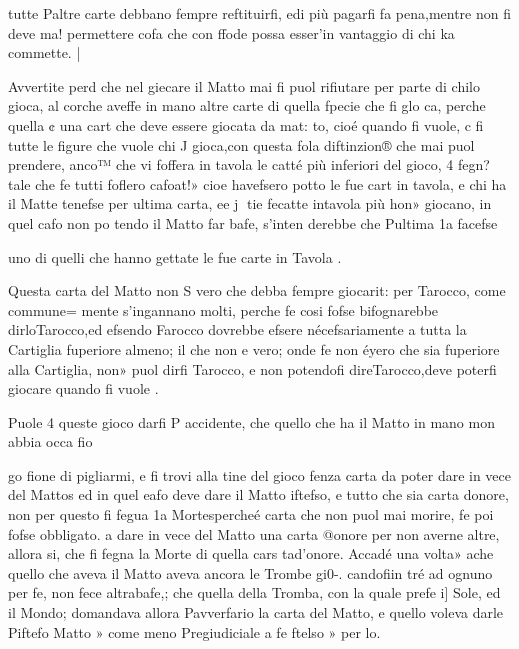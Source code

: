 \documentclass[12pt,a6paper]{article}
\begin{document}
 

 

 

 

 

tutte Paltre carte debbano fempre reftituirfi, edi più pagarfi
fa pena,mentre non fi deve ma!
permettere cofa che con ffode possa esser’in vantaggio di
chi ka commette. |

Avvertite perd che nel giecare il Matto mai fi puol rifiutare per parte di chilo gioca, al
corche aveffe in mano altre
carte di quella fpecie che fi glo
ca, perche quella ¢ una cart
che deve essere giocata da mat:
to, cioé quando fi vuole, c fi
tutte le figure che vuole chi J
gioca,con questa fola diftinzion®
che mai puol prendere, anco™
che vi foffera in tavola le catté
più inferiori del gioco, 4 fegn?
tale che fe tutti foflero cafoat!»
cioe havefsero potto le fue cart
in tavola, e chi ha il Matte
tenefse per ultima carta, ee j
tie fecatte intavola più hon»
giocano, in quel cafo non po
tendo il Matto far bafe, s'inten
derebbe che Pultima 1a facefse

uno di quelli che hanno gettate
le fue carte in Tavola .

Questa carta del Matto non S
vero che debba fempre giocarit:
per Tarocco, come commune=
mente s'ingannano molti, perche fe cosi fofse bifognarebbe
dirloTarocco,ed efsendo Farocco dovrebbe efsere nécefsariamente a tutta la Cartiglia fuperiore almeno; il che non e vero; onde fe non éyero che sia
fuperiore alla Cartiglia, non»
puol dirfi Tarocco, e non potendofi direTarocco,deve poterfi
giocare quando fi vuole .

Puole 4 queste gioco darfi P
accidente, che quello che ha il
Matto in mano mon abbia occa
fio
 

 
 

go
fione di pigliarmi, e fi trovi alla tine del gioco fenza carta da
poter dare in vece del Mattos
ed in quel eafo deve dare il Matto iftefso, e tutto che sia carta
donore, non per questo fi fegua
1a Mortespercheé carta che non
puol mai morire, fe poi fofse
obbligato. a dare in vece del
Matto una carta @onore per
non averne altre, allora si, che
fi fegna la Morte di quella cars
tad’onore. Accadé una volta»
ache quello che aveva il Matto
aveva ancora le Trombe gi0-.
candofiin tré ad ognuno per fe,
non fece altrabafe,; che quella
della Tromba, con la quale prefe i] Sole, ed il Mondo; domandava allora Pavverfario la carta
del Matto, e quello voleva darle Piftefo Matto » come meno
Pregiudiciale a fe ftelso » per lo.
\end{document}
